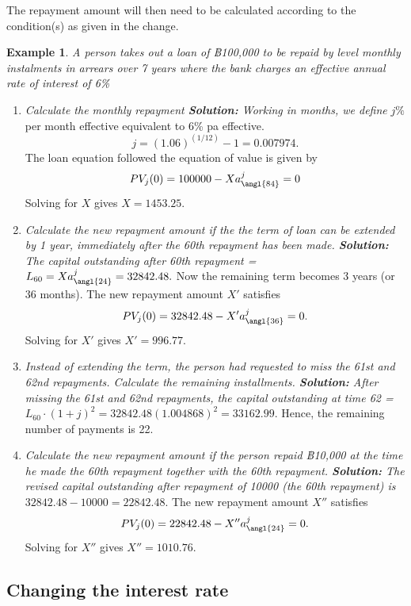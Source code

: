 \documentclass[
]{book}
\theoremstyle{definition}
\theoremstyle{definition}
\newtheorem{example}{Example}[chapter]
\theoremstyle{definition}
\theoremstyle{definition}
\theoremstyle{remark}
\begin{document}
The repayment amount will then need to be calculated according to the
condition(s) as given in the change.

\begin{example}

\emph{A person takes out a loan of ฿100,000 to be repaid by level monthly
instalments in arrears over 7 years where the bank charges an effective
annual rate of interest of 6\%}

\begin{enumerate}
\def\labelenumi{\arabic{enumi}.}
\item
  \emph{Calculate the monthly repayment \textbf{Solution:} Working in months, we
  define} \(j\%\) per month effective equivalent to 6\% pa effective.
  \[j = (1.06)^{(1/12)} - 1 = 0.007974.\] The loan equation followed
  the equation of value is given by
  \[PV_j(0) = 100000 - X a^j_{\angl{84}} = 0\] Solving for \(X\) gives
  \(X =1453.25\).
\item
  \emph{Calculate the new repayment amount if the the term of loan can be
  extended by 1 year, immediately after the 60th repayment has been
  made. \textbf{Solution:} The capital outstanding after 60th repayment =}
  \(L_{60} = X a^j_{\angl{24}} = 32842.48.\) Now the remaining term
  becomes 3 years (or 36 months). The new repayment amount \(X'\)
  satisfies \[PV_j(0) = 32842.48 - X' a^j_{\angl{36}} = 0.\] Solving
  for \(X'\) gives \(X' = 996.77\).
\item
  \emph{Instead of extending the term, the person had requested to miss the
  61st and 62nd repayments. Calculate the remaining installments.
  \textbf{Solution:} After missing the 61st and 62nd repayments, the
  capital outstanding at time 62 =}
  \(L_{60}\cdot (1+j)^2 = 32842.48 (1.004868)^2 = 33162.99.\) Hence, the
  remaining number of payments is 22.
\item
  \emph{Calculate the new repayment amount if the person repaid ฿10,000 at
  the time he made the 60th repayment together with the 60th
  repayment. \textbf{Solution:} The revised capital outstanding after
  repayment of 10000 (the 60th repayment) is}
  \(32842.48 - 10000 = 22842.48.\) The new repayment amount \(X''\)
  satisfies \[PV_j(0) = 22842.48 - X'' a^j_{\angl{24}} = 0.\] Solving
  for \(X''\) gives \(X'' = 1010.76\).
\end{enumerate}

\end{example}

\hypertarget{changing-the-interest-rate}{%
\subsection{Changing the interest rate}\label{changing-the-interest-rate}}
\end{document}
